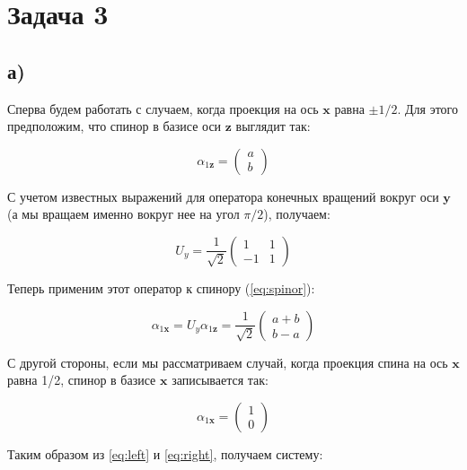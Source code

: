 \documentclass[a4paper, 12pt]{article}
\begin{document}
\section*{Задача 3}
\subsection*{а)}

Сперва будем работать с случаем, когда проекция на ось $\mathbf{x}$ равна $\pm 1/2$. Для этого предположим, что спинор в базисе оси $\mathbf{z}$ выглядит так:

\begin{equation}
	\alpha_{1\mathbf{z}} = 
	\begin{pmatrix}
		a \\
		b
	\end{pmatrix}
	\label{eq:spinor}
\end{equation}

С учетом известных выражений для оператора конечных вращений вокруг оси $\mathbf{y}$ (а мы вращаем именно вокруг нее на угол $\pi/2$), получаем:

\begin{equation*}
	U_y = \frac{1}{\sqrt{2}}
	\begin{pmatrix}
		1 & 1\\
		-1 & 1
	\end{pmatrix}
\end{equation*}

Теперь применим этот оператор к спинору (\ref{eq:spinor}):

\begin{equation}
	\alpha_{1\mathbf{x}} = U_y \alpha_{1\mathbf{z}} = \frac{1}{\sqrt{2}} 
	\begin{pmatrix}
		a + b \\
		b - a
	\end{pmatrix}
	\label{eq:left}
\end{equation}

С другой стороны, если мы рассматриваем случай, когда проекция спина на ось $\mathbf{x}$ равна 1/2, спинор в базисе $\mathbf{x}$ записывается так:

\begin{equation}
	\alpha_{1\mathbf{x}} = 
	\begin{pmatrix}
		1\\
		0
	\end{pmatrix}
	\label{eq:right}
\end{equation}

Таким образом из \ref{eq:left} и \ref{eq:right}, получаем систему:
\end{document}
